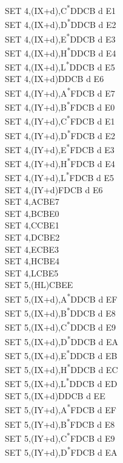 \documentclass[oneside,a4paper]{book}
\begin{document}
\begin{multicols}{3}
{\begin{tabbing}
SET 4,(IX+d),C\textsuperscript{*}\>DDCB d E1\\
SET 4,(IX+d),D\textsuperscript{*}\>DDCB d E2\\
SET 4,(IX+d),E\textsuperscript{*}\>DDCB d E3\\
SET 4,(IX+d),H\textsuperscript{*}\>DDCB d E4\\
SET 4,(IX+d),L\textsuperscript{*}\>DDCB d E5\\
SET 4,(IX+d)\>DDCB d E6\\
SET 4,(IY+d),A\textsuperscript{*}\>FDCB d E7\\
SET 4,(IY+d),B\textsuperscript{*}\>FDCB d E0\\
SET 4,(IY+d),C\textsuperscript{*}\>FDCB d E1\\
SET 4,(IY+d),D\textsuperscript{*}\>FDCB d E2\\
SET 4,(IY+d),E\textsuperscript{*}\>FDCB d E3\\
SET 4,(IY+d),H\textsuperscript{*}\>FDCB d E4\\
SET 4,(IY+d),L\textsuperscript{*}\>FDCB d E5\\
SET 4,(IY+d)\>FDCB d E6\\
SET 4,A\>CBE7\\
SET 4,B\>CBE0\\
SET 4,C\>CBE1\\
SET 4,D\>CBE2\\
SET 4,E\>CBE3\\
SET 4,H\>CBE4\\
SET 4,L\>CBE5\\
SET 5,(HL)\>CBEE\\
SET 5,(IX+d),A\textsuperscript{*}\>DDCB d EF\\
SET 5,(IX+d),B\textsuperscript{*}\>DDCB d E8\\
SET 5,(IX+d),C\textsuperscript{*}\>DDCB d E9\\
SET 5,(IX+d),D\textsuperscript{*}\>DDCB d EA\\
SET 5,(IX+d),E\textsuperscript{*}\>DDCB d EB\\
SET 5,(IX+d),H\textsuperscript{*}\>DDCB d EC\\
SET 5,(IX+d),L\textsuperscript{*}\>DDCB d ED\\
SET 5,(IX+d)\>DDCB d EE\\
SET 5,(IY+d),A\textsuperscript{*}\>FDCB d EF\\
SET 5,(IY+d),B\textsuperscript{*}\>FDCB d E8\\
SET 5,(IY+d),C\textsuperscript{*}\>FDCB d E9\\
SET 5,(IY+d),D\textsuperscript{*}\>FDCB d EA\\

\end{tabbing}}
\end{multicols}
\end{document}
